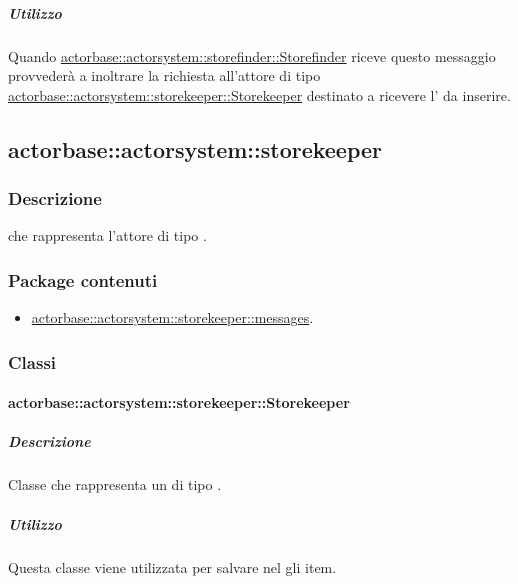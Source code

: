 \documentclass{scalatekids-article}
\begin{document}
\subparagraph{Utilizzo}

Quando \hyperref[sec:actorbase::actorsystem::storefinder::Storefinder]{actorbase::\allowbreak{}actorsystem::\allowbreak{}storefinder::\allowbreak{}Storefinder}
riceve questo messaggio provvederà a inoltrare la richiesta all'attore di tipo
\hyperref[sec:actorbase::actorsystem::storekeeper::Storekeeper]{actorbase::\allowbreak{}actorsystem::\allowbreak{}storekeeper::\allowbreak{}Storekeeper}
destinato a ricevere l' da inserire.

\subsection{actorbase::actorsystem::storekeeper}
\label{sec:actorbase::actorsystem::storekeeper}

\subsubsection{Descrizione}

 che rappresenta l'attore di tipo .

\subsubsection{Package contenuti}

\begin{itemize}

\item \hyperref[sec:actorbase::actorsystem::storekeeper::messages]{actorbase::actorsystem::storekeeper::messages}.

\end{itemize}

\subsubsection{Classi}

\paragraph{actorbase::actorsystem::storekeeper::Storekeeper}
\label{sec:actorbase::actorsystem::storekeeper::Storekeeper}

\subparagraph{Descrizione}

Classe che rappresenta un  di tipo .

\subparagraph{Utilizzo}

Questa classe viene utilizzata per salvare nel  gli item.
\end{document}
